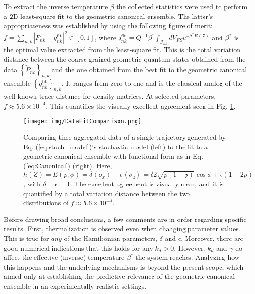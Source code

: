 \documentclass[draft,nofootinbib,pre,twocolumn,showpacs,showkeys,groupaddress,preprintnumbers,floatfix]{revtex4-1}
\newcommand{\1}{\mathbbm{1}}
\newcommand{\MV}[1]{\left\langle #1 \right\rangle}
\begin{document}
To extract the inverse temperature $\beta$ the collected statistics were used
to perform a $2$D least-square fit to the geometric canonical ensemble. The
latter's appropriateness was established by using the following figure of
merit: $f = \sum_{n,k} |\tilde{P}_{nk} - q_{nk}^{\mathrm{fit}} |^2 \in [0,1]$,
where $q_{nk}^{\mathrm{fit}} = Q^{-1}{\beta^*} \int_{\mathcal{I}_{nk}}
dV_{FS}e^{-\beta^{*} E(Z)}$ and $\beta^{*}$ is the optimal value extracted
from the least-square fit. This is the total variation distance between the
coarse-grained geometric quantum states obtained from the data
$\left\{\tilde{P}_{nk}\right\}_{n,k}$ and the one obtained from the best fit
to the geometric canonical ensemble
$\left\{q_{nk}^{\mathrm{fit}}\right\}_{n,k}$. It ranges from zero to one and
is the classical analog of the well-known trace-distance for density matrices.
At selected parameters, $f\approx 5.6 \times 10^{-4}$. This quantifies the
visually excellent agreement seen in Fig. \ref{fig:DataFitComparison}.

\begin{figure}[h]
\centering
\texttt{[image: img/DataFitComparison.png]}
\caption{Comparing time-aggregated data of a single trajectory
	generated by Eq. (\ref{eq:stoch_model})'s stochastic model (left)
	to the fit to a geometric canonical ensemble with functional form as in
	Eq. (\ref{eq:Canonical}) (right). Here, $h(Z) = E(p,\phi) =\delta
	\MV{\sigma_x} + \epsilon \MV{\sigma_z}=\delta 2 \sqrt{p(1-p)}\cos \phi +
	\epsilon (1-2p)$, with $\delta=\epsilon=1$. The excellent agreement is
	visually clear, and it is quantified by a total variation distance between the
	two distributions of $f \approx 5.6  \times 10^{-4}$.
	}
\label{fig:DataFitComparison} 
\end{figure}

Before drawing broad conclusions, a few comments are in order regarding
specific results. First, thermalization is observed even when changing
parameter values. This is true for \emph{any} of the Hamiltonian parameters,
$\delta$ and $\epsilon$. Moreover, there are good numerical indications that
this holds for any $k_d > 0$. However, $k_d$ and $\gamma$ do affect the
effective (inverse) temperature $\beta^{*}$ the system reaches. Analyzing how
this happens and the underlying mechanisms is beyond the present scope, which
aimed only at establishing the predictive relevance of the geometric canonical
ensemble in an experimentally realistic settings.
\end{document}
